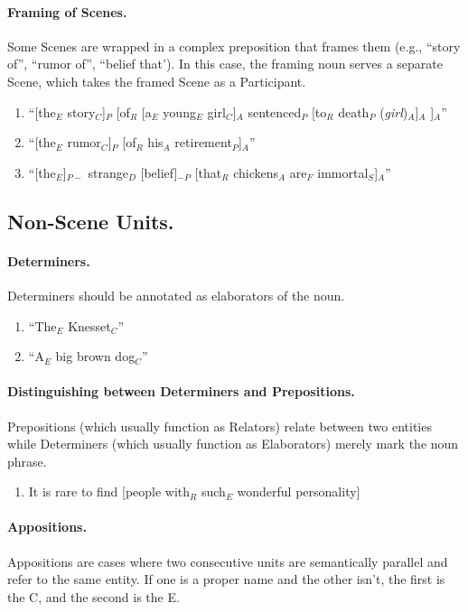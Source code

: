 \documentclass[11pt]{article}
\newcommand{\be}{\begin{enumerate}}
\newcommand{\ee}{\end{enumerate}}
\newcommand{\dd}[1]{{\color{blue}{#1}}}
\newcommand{\oa}[1]{{\color{blue}{OA: #1}}}
\newcommand{\rem}[1]{{(\it #1})}
\begin{document}
\paragraph{Framing of Scenes.}
Some Scenes are wrapped in a complex preposition that frames them (e.g., ``story of'', ``rumor of'', ``belief that'). In this case, the framing noun serves a separate Scene, which takes the framed Scene as a Participant.
     
     \begin{enumerate}
     \item
       ``[the$_E$ story$_C$]$_P$ [of$_R$ [a$_E$ young$_E$ girl$_C$]$_A$ sentenced$_P$ [to$_R$ death$_P$ \rem{girl}$_A$]$_A$ ]$_A$''
     \item
       ``[the$_E$ rumor$_C$]$_P$ [of$_R$ his$_A$ retirement$_P$]$_A$''
     \item
       ``[the$_E$]$_{P-}$ strange$_D$ [belief]$_{-P}$ [that$_R$ chickens$_A$ are$_F$ immortal$_S$]$_A$''
     \end{enumerate}


\subsection{Non-Scene Units.}

\paragraph{Determiners.} Determiners should be annotated as elaborators of the noun. 
\be \item
``The$_E$ Knesset$_C$''
\item
``A$_E$ big brown dog$_C$''
\ee

\paragraph{Distinguishing between Determiners and Prepositions.}
Prepositions (which usually function as Relators) relate between two entities while Determiners (which usually function as Elaborators)  merely mark the noun phrase. 

\be
\item
It is rare to find [people with$_R$ such$_E$ wonderful personality]  
\ee
 
\paragraph{Appositions.} Appositions are cases where two consecutive units are semantically parallel and refer to the same entity. If one is a proper name and the other isn't, the first is the C, and the second is the E.
\end{document}
